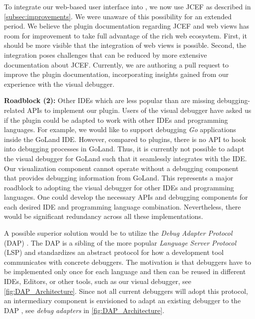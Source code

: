 \documentclass[sigconf]{acmart}
\begin{document}
To integrate our web-based user interface into \intellij{}, we now use JCEF as described in \autoref{subsec:improvements}.
We were unaware of this possibility for an extended period.
We believe the plugin documentation regarding JCEF and web views has room for improvement to take full advantage of the rich web ecosystem.
First, it should be more visible that the integration of web views is possible.
Second, the integration poses challenges that can be reduced by more extensive documentation about JCEF.
Currently, we are authoring a pull request to improve the plugin documentation, incorporating insights gained from our experience with the visual debugger. %

\textbf{Roadblock (2):} Other IDEs which are less popular than \intellij{} are missing debugging-related APIs to implement our plugin.
Users of the visual debugger have asked us if the plugin could be adapted to work with other IDEs and programming languages.
For example, we would like to support debugging \textit{Go} applications inside the GoLand IDE.
However, compared to \intellij{} plugins, there is no API to hook into debugging processes in GoLand.
Thus, it is currently not possible to adapt the visual debugger for GoLand such that it seamlessly integrates with the IDE.
Our visualization component cannot operate without a debugging component that provides debugging information from GoLand.
This represents a major roadblock to adopting the visual debugger for other IDEs and programming languages.
One could develop the necessary APIs and debugging components for each desired IDE and programming language combination.
Nevertheless, there would be significant redundancy across all these implementations.

A possible superior solution would be to utilize the \textit{Debug Adapter Protocol} (DAP) \cite{microsoftDebugAdapterProtocol2023}.
The DAP is a sibling of the more popular \textit{Language Server Protocol} (LSP) \cite{microsoftLanguageServerProtocol2023} and standardizes an abstract protocol for how a development tool communicates with concrete debuggers.
The motivation is that debuggers have to be implemented only once for each language and then can be reused in different IDEs, Editors, or other tools, such as our visual debugger, see \autoref{fig:DAP_Architecture}.
Since not all current debuggers will adopt this protocol, an intermediary component is envisioned to adapt an existing debugger to the DAP \cite{microsoftDebugAdapterProtocol2023}, see \textit{debug adapters} in \autoref{fig:DAP_Architecture}.
\end{document}
